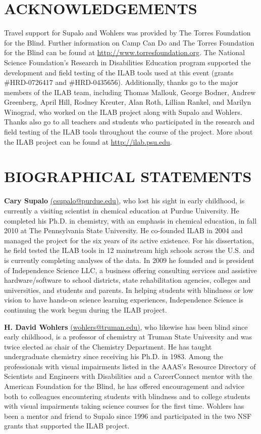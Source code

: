 \documentclass[11.5pt]{sig-alternate} %
\begin{document}
\begin{large}
\section*{ACKNOWLEDGEMENTS}
Travel support for Supalo and Wohlers was provided by The Torres Foundation for the Blind. Further information on Camp Can Do and The Torres Foundation for the Blind can be found at \url{http://www.torresfoundation.org}. The National Science Foundation’s Research in Disabilities Education program supported the development and field testing of the ILAB tools used at this event (grants \#HRD-0726417 and \#HRD-0435656). Additionally, thanks go to the major members of the ILAB team, including Thomas Mallouk, George Bodner, Andrew Greenberg, April Hill, Rodney Kreuter, Alan Roth, Lillian Rankel, and Marilyn Winograd, who worked on the ILAB project along with Supalo and Wohlers. Thanks also go to all teachers and students who participated in the research and field testing of the ILAB tools throughout the course of the project. More about the ILAB project can be found at \url{http://ilab.psu.edu}.

\section*{BIOGRAPHICAL STATEMENTS}
\textbf{Cary Supalo} \href{mailto:csupalo@purdue.edu}{(csupalo@purdue.edu)}, who lost his sight in early childhood, is currently a visiting scientist in chemical education at Purdue University. He completed his Ph.D. in chemistry, with an emphasis in chemical education, in fall 2010 at The Pennsylvania State University. He co-founded ILAB in 2004 and managed the project for the six years of its active existence. For his dissertation, he field tested the ILAB tools in 12 mainstream high schools across the U.S. and is currently completing analyses of the data. In 2009 he founded and is president of Independence Science LLC, a business offering consulting services and assistive hardware/software to school districts, state rehabilitation agencies, colleges and universities, and students and parents. In helping students with blindness or low vision to have hands-on science learning experiences, Independence Science is continuing the work begun during the ILAB project.

\textbf{H. David Wohlers} \href{mailto:wohlers@truman.edu}{(wohlers@truman.edu)}, who likewise has been blind since early childhood, is a professor of chemistry at Truman State University and was twice elected as chair of the Chemistry Department. He has taught undergraduate chemistry since receiving his Ph.D. in 1983. Among the professionals with visual impairments listed in the AAAS’s Resource Directory of Scientists and Engineers with Disabilities and a CareerConnect mentor with the American Foundation for the Blind, he has offered encouragement and advice both to colleagues encountering students with blindness and to college students with visual impairments taking science courses for the first time. Wohlers has been a mentor and friend to Supalo since 1996 and participated in the two NSF grants that supported the ILAB project.


\end{large}
\end{document}

